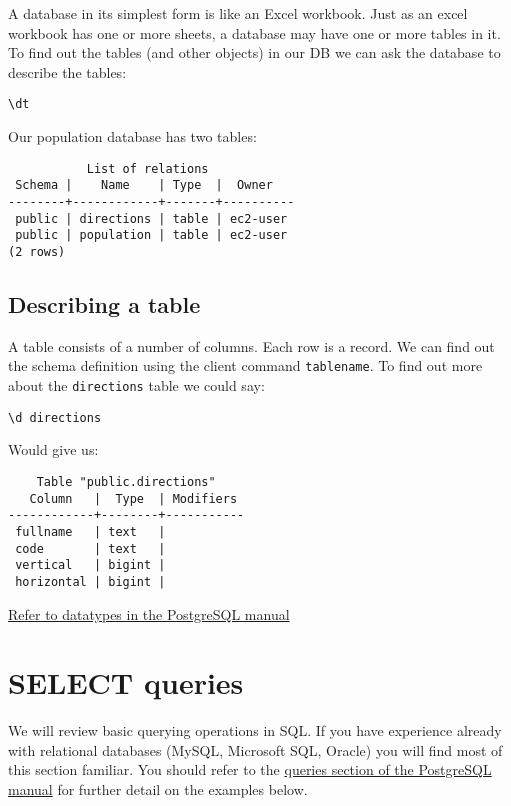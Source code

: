 A database in its simplest form is like an Excel workbook.
Just as an excel workbook has one or more sheets, a database may have one or more tables in it.
To find out the tables (and other objects) in our DB we can ask the database to describe the tables:

\begin{verbatim}
\dt
\end{verbatim}

Our population database has two tables:

\begin{verbatim}
           List of relations
 Schema |    Name    | Type  |  Owner   
--------+------------+-------+----------
 public | directions | table | ec2-user
 public | population | table | ec2-user
(2 rows)
\end{verbatim}

\subsection{Describing a table}\label{describing-a-table}

A table consists of a number of columns. Each row is a record. We can
find out the schema definition using the client command
\texttt{tablename}. To find out more about the \texttt{directions} table
we could say:

\begin{verbatim}
\d directions
\end{verbatim}

Would give us:

\begin{verbatim}
    Table "public.directions"
   Column   |  Type  | Modifiers 
------------+--------+-----------
 fullname   | text   | 
 code       | text   | 
 vertical   | bigint | 
 horizontal | bigint | 
\end{verbatim}

\href{https://www.postgresql.org/docs/13/datatype.html}{Refer to
datatypes in the PostgreSQL manual}

\section{SELECT queries}\label{select-queries}

We will review basic querying operations in SQL.
If you have experience already with relational databases (MySQL, Microsoft SQL, Oracle) you will find most of this section familiar.
You should refer to the \href{https://www.postgresql.org/docs/13/queries.html}{queries section of the PostgreSQL manual} for further detail on the examples below.


